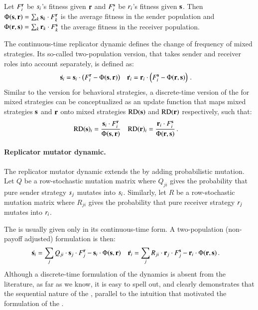 Let $F_i^{\mathrm{\mathbf{r}}}$ be $s_i$'s fitness given $\mathrm{\mathbf{r}}$ and
$F_i^{\mathrm{\mathbf{s}}}$ be $r_i$'s fitness given $\mathrm{\mathbf{s}}$. Then
$\Phi(\mathrm{\mathbf{s}},\mathrm{\mathbf{r}}) = \sum_{k} \mathrm{\mathbf{s}}_k \cdot F_k^{\mathrm{\mathbf{r}}}$ is
the average fitness in the sender population and
$\Phi(\mathrm{\mathbf{r}},\mathrm{\mathbf{s}}) = \sum_{k} \mathrm{\mathbf{r}}_k \cdot F_k^{\mathrm{\mathbf{s}}}$ the
average fitness in the receiver population.

The continuous-time replicator dynamic defines the change of frequency
of mixed strategies. Its so-called two-population version, that takes
sender and receiver roles into account separately, is defined as:
\begin{align*}
  \dot{\mathrm{\mathbf{s}}_i} & = \mathrm{\mathbf{s}}_i \cdot \left ( F_i^{\mathrm{\mathbf{r}}} -
  \Phi(\mathrm{\mathbf{s}},\mathrm{\mathbf{r}}) \right ) &   \dot{\mathrm{\mathbf{r}}_i} &  = \mathrm{\mathbf{r}}_i \cdot \left ( F_i^{\mathrm{\mathbf{s}}} -
  \Phi(\mathrm{\mathbf{r}},\mathrm{\mathbf{s}}) \right ) \,.
\end{align*}
Similar to the version for behavioral strategies, a discrete-time
version of the \rd for mixed strategies can be conceptualized as an
update function that maps mixed strategies $\mathrm{\mathbf{s}}$ and $\mathrm{\mathbf{r}}$
onto mixed strategies $\mathrm{RD}(\mathrm{\mathbf{s}})$ and $\mathrm{RD}(\mathrm{\mathbf{r}})$ respectively,
such that:
\begin{align*}
  \mathrm{RD}(\mathrm{\mathbf{s}})_i & = \frac{\mathrm{\mathbf{s}}_i \cdot F_i^{\mathrm{\mathbf{r}}}}{
    \Phi(\mathrm{\mathbf{s}},\mathrm{\mathbf{r}})} & \mathrm{RD}(\mathrm{\mathbf{r}})_i & = \frac{\mathrm{\mathbf{r}}_i \cdot
    F_i^{\mathrm{\mathbf{s}}}}{ \Phi(\mathrm{\mathbf{r}},\mathrm{\mathbf{s}})} \,.
\end{align*}


\paragraph{Replicator mutator dynamic.} The replicator mutator dynamic
extends the \rd by adding probabilistic mutation. Let $Q$ be a
row-stochastic mutation matrix where $Q_{ji}$ gives the probability
that pure sender strategy $s_j$ mutates into
$s_i$. Similarly, let $R$ be a row-stochastic mutation matrix
where $R_{ji}$ gives the probability that pure receiver strategy
$r_j$ mutates into $r_i$.

The \rmd is usually given only in its continuous-time form. A
two-population (non-payoff adjusted) formulation is then:
\begin{align*}
  \dot{\mathrm{\mathbf{s}}_i} & = \sum_{j}  Q_{ji} \cdot \mathrm{\mathbf{s}}_j
    \cdot F_j^{\mathrm{\mathbf{r}}} - \mathrm{\mathbf{s}}_i \cdot \Phi(\mathrm{\mathbf{s}},\mathrm{\mathbf{r}}) &
    \dot{\mathrm{\mathbf{r}}_i} & = \sum_{j}  R_{ji} \cdot \mathrm{\mathbf{r}}_j
    \cdot F_j^{\mathrm{\mathbf{s}}} - \mathrm{\mathbf{r}}_i \cdot \Phi(\mathrm{\mathbf{r}},\mathrm{\mathbf{s}}) \,.
\end{align*}
Although a discrete-time formulation of the dynamics is absent from the
literature, as far as we know, it is easy to spell out, and clearly
demonstrates that the sequential nature of the \rmd, parallel to the
intuition that motivated the formulation of the \rdd.

